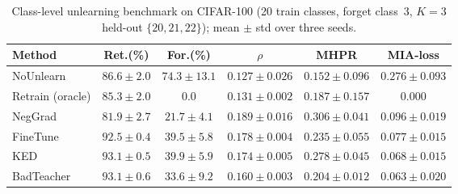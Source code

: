 \documentclass[smallextended]{svjour3}       %
\begin{document}
\begin{table}[t]
\centering
\small
\caption{Class-level unlearning benchmark on CIFAR-100 (20 train classes, forget class~3, $K{=}3$ held-out $\{20,21,22\}$); mean $\pm$ std over three seeds.}\label{tab:cifar100}
\setlength{\tabcolsep}{2pt}
\begin{tabular}{l c c c c c}
\toprule
Method & Ret.(\%) & For.(\%) & $\rho$ & MHPR & MIA-loss \\
\midrule
NoUnlearn & $86.6{\pm}2.0$ & $74.3{\pm}13.1$ & $0.127{\pm}0.026$ & $0.152{\pm}0.096$ & $0.276{\pm}0.093$ \\
Retrain (oracle) & $85.3{\pm}2.0$ & 0.0 & $0.131{\pm}0.002$ & $0.187{\pm}0.157$ & 0.000 \\
NegGrad & $81.9{\pm}2.7$ & $21.7{\pm}4.1$ & $\mathbf{0.189{\pm}0.016}$ & $0.306{\pm}0.041$ & $0.096{\pm}0.019$ \\
FineTune & $92.5{\pm}0.4$ & $39.5{\pm}5.8$ & $0.178{\pm}0.004$ & $0.235{\pm}0.055$ & $0.077{\pm}0.015$ \\
KED & $93.1{\pm}0.5$ & $39.9{\pm}5.9$ & $0.174{\pm}0.005$ & $0.278{\pm}0.045$ & $0.068{\pm}0.015$ \\
BadTeacher & $93.1{\pm}0.6$ & $33.6{\pm}9.2$ & $0.160{\pm}0.003$ & $0.204{\pm}0.012$ & $0.063{\pm}0.020$ \\
\bottomrule
\end{tabular}
\end{table}
\end{document}
